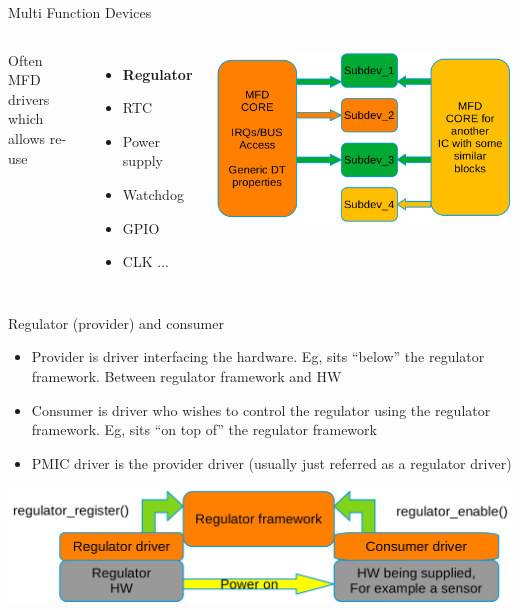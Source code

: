 \documentclass[10pt]{beamer}
\begin{document}
\begin{frame}{Multi Function Devices}
	\begin{columns}
Often MFD drivers which allows re-use
	\begin{itemize}
		\item \textbf{Regulator}
		\item RTC
		\item Power supply
		\item Watchdog
		\item GPIO
		\item CLK ...
	\end{itemize}
		\includegraphics[width=1\linewidth]{MFD_re_use.png}
	\end{columns}
\end{frame}


\begin{frame}{Regulator (provider) and consumer}
\begin{itemize}
	\item Provider is driver interfacing the hardware. Eg, sits “below” the regulator framework. Between regulator framework and HW
	\item Consumer is driver who wishes to control the regulator using the regulator framework. Eg, sits “on top of” the regulator framework
	\item PMIC driver is the provider driver (usually just referred as a regulator driver) \\[10pt]
\end{itemize}
\includegraphics[width=1\linewidth]{regulator_users.png}
\end{frame}
\end{document}
